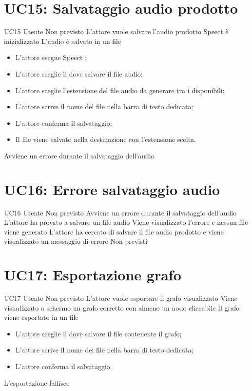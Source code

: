 \documentclass[../AnalisideiRequisiti.tex]{subfiles}
\begin{document}
	\section{UC15: Salvataggio audio prodotto}
	\UserCase
	{UC15}
	{Utente}
	{Non previsto}
	{L'attore vuole salvare l'audio prodotto}
	{Speect è inizializzato }
	{L'audio è salvato in un file}
	{
		\begin{itemize}
			\item{} L'attore esegue Speect ;
			\item{} L'attore sceglie il dove salvare il file audio;
			\item{} L'attore sceglie l'estensione del file audio da generare tra i disponibili;
			\item{} L'attore scrive il nome del file nella barra di testo dedicata;
			\item{} L'attore conferma il salvataggio;
			\item{} Il file viene salvato nella destinazione con l'estensione scelta.
		\end{itemize}
	}
	{Avviene un errore durante il salvataggio dell'audio }
	
	\section{UC16: Errore salvataggio audio}
	\UserCase
	{UC16}
	{Utente}
	{Non previsto}
	{Avviene un errore durante il salvataggio dell'audio}
	{L'attore ha provato a salvare un file audio}
	{Viene visualizzato l'errore e nessun file viene generato}
	{L'attore ha cercato di salvare il file audio prodotto e viene visualizzato un messaggio di errore}
	{Non previsti}
	
	\section{UC17: Esportazione grafo}
	\UserCase
	{UC17}
	{Utente}
	{Non previsto}
	{L'attore vuole esportare il grafo visualizzato}
	{Viene visualizzato a schermo un grafo corretto con almeno un nodo cliccabile }
	{Il grafo viene esportato in un file}
	{
		\begin{itemize}
			\item{} L'attore sceglie il dove salvare il file contenente il grafo;
			\item{} L'attore scrive il nome del file nella barra di testo dedicata;
			\item{} L'attore conferma il salvataggio.
		\end{itemize}
	}
	{L'esportazione fallisce }
	
\end{document}
